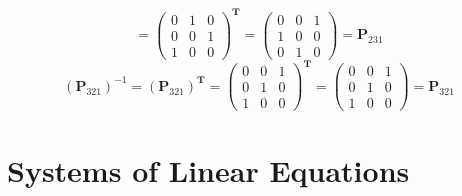 \documentclass[oneside]{book}
\begin{document}
{{$$            =
            \begin{pmatrix}
                0 & 1 & 0\\
                0 & 0 & 1\\
                1 & 0 & 0
            \end{pmatrix}^{\mathbf{T}}
            =
            \begin{pmatrix}
                0 & 0 & 1\\
                1 & 0 & 0\\
                0 & 1 & 0
            \end{pmatrix}
            =
            \mathbf{P}_{231}$$
        $$(\mathbf{P}_{321})^{-1}=(\mathbf{P}_{321})^{\mathbf{T}}
            =
            \begin{pmatrix}
                0 & 0 & 1\\
                0 & 1 & 0\\
                1 & 0 & 0
            \end{pmatrix}^{\mathbf{T}}
            =
            \begin{pmatrix}
                0 & 0 & 1\\
                0 & 1 & 0\\
                1 & 0 & 0
            \end{pmatrix}
            =
            \mathbf{P}_{321}$$
    }
}

\chapter{Systems of Linear Equations}
\end{document}
